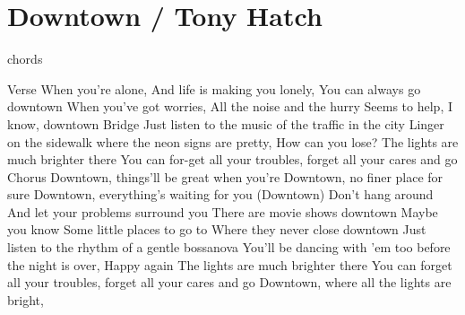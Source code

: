 \section{Downtown / Tony Hatch}\label{sec:downtown}
  {\small chords}
  
  \Aminor
  \BflatMajor
  \Cseven
  \Dminor
  \Gseven
  
  Verse
  When you're alone, And life is making you lonely,
  You can always go downtown
  When you've got worries, All the noise and the hurry
  Seems to help, I know, downtown
  Bridge
  Just listen to the music of the traffic in the city
  Linger on the sidewalk where the neon signs are pretty, How can you lose?
  The lights are much brighter there
  You can for-get all your troubles, forget all your cares and go
  Chorus
  Downtown, things'll be great when you're
  Downtown, no finer place for sure
  Downtown, everything's waiting for you
  (Downtown)
  Don't hang around And let your problems surround you
  There are movie shows
  downtown
  Maybe you know Some little places to go to
  Where they never close downtown
  Just listen to the rhythm of a gentle bossanova
  You'll be dancing with 'em too before the night is over, Happy again
  The lights are much brighter there
  You can forget all your troubles, forget all your cares and go
  Downtown, where all the lights are bright,
  
